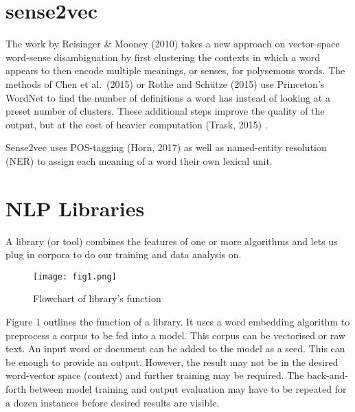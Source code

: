 \documentclass[12pt, usenames, dvipsnames]{report}
\begin{document}
\begin{flushleft}

\section{sense2vec}

The work by Reisinger \& Mooney (2010) \cite{reisinger2010} takes a new approach on vector-space word-sense disambiguation by first clustering the contexts in which a word appears to then encode multiple meanings, or senses, for polysemous words.
The methods of Chen et al.\ (2015) \cite{chen2015} or Rothe and Schütze (2015) \cite{rothe2015} use Princeton’s WordNet to find the number of definitions a word has instead of looking at a preset number of clusters.
These additional steps improve the quality of the output, but at the cost of heavier computation (Trask, 2015) \cite{trask2015}.

Sense2vec uses POS-tagging (Horn, 2017) \cite{horn2017} as well as named-entity resolution (NER) to assign each meaning of a word their own lexical unit.


\section{NLP Libraries}

A library (or tool) combines the features of one or more algorithms and lets us plug in corpora to do our training and data analysis on.

\vspace*{1.2em}
\begin{figure}[!htbp]
  \hspace*{-3.666em}
  \texttt{[image: fig1.png]}
  \caption{Flowchart of library's function}
  \label{fig:figure1}
\end{figure}
\vspace*{1.2em}

Figure 1 outlines the function of a library.
It uses a word embedding algorithm to preprocess a corpus to be fed into a model.
This corpus can be vectorised or raw text.
An input word or document can be added to the model as a seed.
This can be enough to provide an output.
However, the result may not be in the desired word-vector space (context) and further training may be required.
The back-and-forth between model training and output evaluation may have to be repeated for a dozen instances before desired results are visible.


\end{flushleft}
\end{document}
